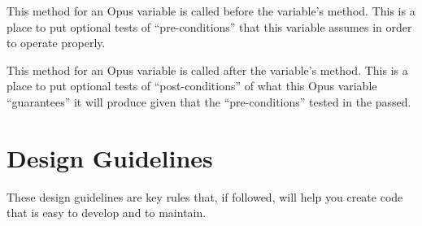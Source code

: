\begin{description}

\item[\method{pre_check}] This method for an Opus
variable is called before the variable's  method.  This is a
place to put optional tests of ``pre-conditions'' that this variable assumes in
order to operate properly.

\item[\method{post_check}]  This method for an Opus
variable is called after the variable's  method.  This is a
place to put optional tests of ``post-conditions'' of what this Opus variable
``guarantees'' it will produce given that the ``pre-conditions'' tested in the
 passed.

\end{description}

\section{Design Guidelines}

These design guidelines are key rules that, if followed, will help you
create code that is easy to develop and to maintain.

